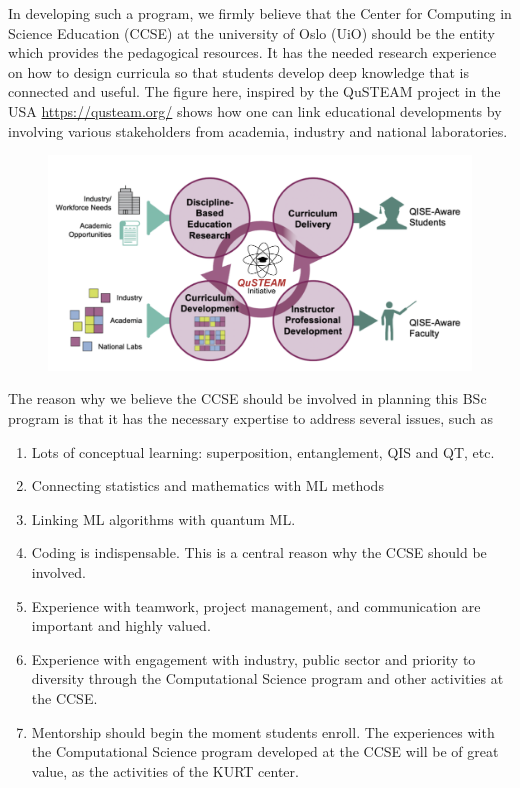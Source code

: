 \documentclass[aps,rmp,preprint,amsmath,amssymb,graphicx,longbibliography]{revtex4-1}
\begin{document}
In developing such a program, we firmly believe that 
the Center for Computing in Science Education (CCSE) at the university of Oslo (UiO) should be the entity which provides the pedagogical resources. It has the needed research experience
on how to design curricula so that students develop deep knowledge that is connected and useful.
The figure here, inspired by the QuSTEAM project in the USA \url{https://qusteam.org/}
shows how one can link educational developments by involving various stakeholders from academia, industry and national laboratories. 
\begin{figure}[!htb]
\includegraphics[width=1.0\linewidth]{qusteam.png}
\end{figure}


The reason why we believe the CCSE should be involved in planning this BSc program is that it has the necessary expertise to address several issues, such as
\begin{enumerate}
    \item  Lots of conceptual learning: superposition, entanglement, QIS and QT, etc. 
    \item Connecting statistics and mathematics with ML methods
    \item Linking ML algorithms with quantum ML.
\item Coding is indispensable. This is a central reason why the CCSE should be involved.
\item Experience with teamwork, project management, and communication are important and highly valued.
\item  Experience with engagement with industry, public sector and priority to diversity through the Computational Science program and other activities at the CCSE.
\item  Mentorship should begin the moment students enroll. The experiences with the Computational Science program developed at the CCSE will be of great value, as the activities of the KURT center.
\end{enumerate}
\end{document}
